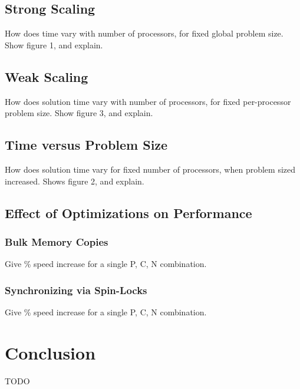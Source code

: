 \documentclass[11pt]{article} %
\begin{document}
\subsection{Strong Scaling}

How does time vary with number of processors, for fixed global problem size. Show figure 1, and explain.

\subsection{Weak Scaling}

How does solution time vary with number of processors, for fixed per-processor problem size. Show figure 3, and explain.

\subsection{Time versus Problem Size}

How does solution time vary for fixed number of processors, when problem sized increased. Shows figure 2, and explain.

\subsection{Effect of Optimizations on Performance}

\subsubsection{Bulk Memory Copies}

Give \% speed increase for a single P, C, N combination.

\subsubsection{Synchronizing via Spin-Locks}

Give \% speed increase for a single P, C, N combination.

\section{Conclusion}

TODO
\end{document}
